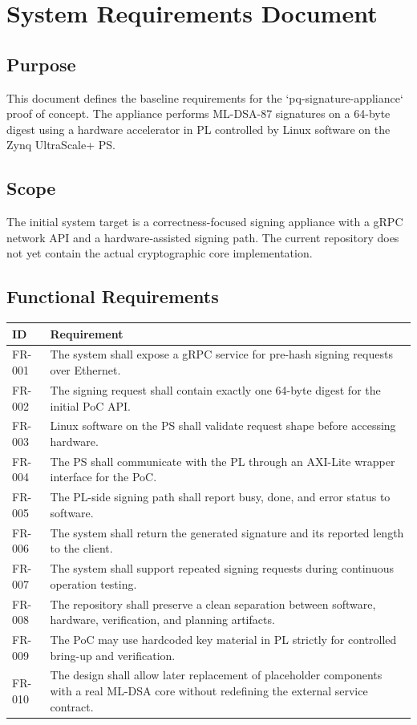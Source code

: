 ﻿\chapter{System Requirements Document}

\section*{Purpose}
This document defines the baseline requirements for the `pq-signature-appliance` proof of concept. The appliance performs ML-DSA-87 signatures on a 64-byte digest using a hardware accelerator in PL controlled by Linux software on the Zynq UltraScale+ PS.

\section{Scope}
The initial system target is a correctness-focused signing appliance with a gRPC network API and a hardware-assisted signing path. The current repository does not yet contain the actual cryptographic core implementation.

\section{Functional Requirements}
\begin{longtable}{p{} p{}}
\toprule
ID & Requirement \\
\midrule
FR-001 & The system shall expose a gRPC service for pre-hash signing requests over Ethernet. \\
FR-002 & The signing request shall contain exactly one 64-byte digest for the initial PoC API. \\
FR-003 & Linux software on the PS shall validate request shape before accessing hardware. \\
FR-004 & The PS shall communicate with the PL through an AXI-Lite wrapper interface for the PoC. \\
FR-005 & The PL-side signing path shall report busy, done, and error status to software. \\
FR-006 & The system shall return the generated signature and its reported length to the client. \\
FR-007 & The system shall support repeated signing requests during continuous operation testing. \\
FR-008 & The repository shall preserve a clean separation between software, hardware, verification, and planning artifacts. \\
FR-009 & The PoC may use hardcoded key material in PL strictly for controlled bring-up and verification. \\
FR-010 & The design shall allow later replacement of placeholder components with a real ML-DSA core without redefining the external service contract. \\
\bottomrule
\end{longtable}

